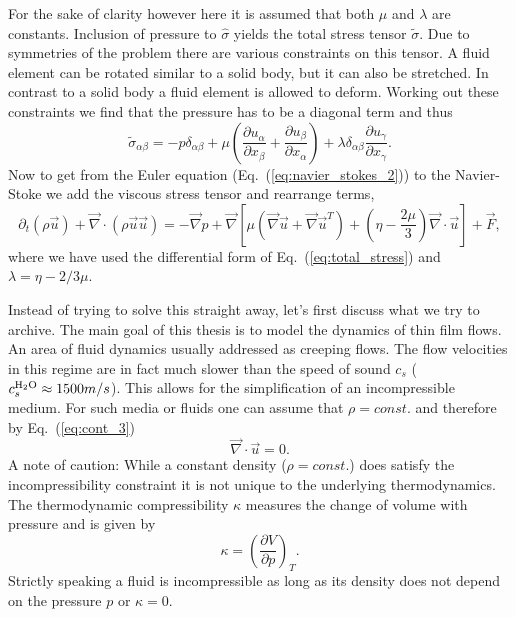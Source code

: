 For the sake of clarity however here it is assumed that both $\mu$ and $\lambda$ are constants.
Inclusion of pressure to $\hat{\sigma}$ yields the total stress tensor $\tilde{\sigma}$. 
Due to symmetries of the problem there are various constraints on this tensor.
A fluid element can be rotated similar to a solid body, but it can also be stretched. 
In contrast to a solid body a fluid element is allowed to deform.
Working out these constraints we find that the pressure has to be a diagonal term and thus
\begin{equation}\label{eq:total_stress}
    \tilde{\sigma}_{\alpha\beta} = - p \delta_{\alpha\beta} + \mu\left(\frac{\partial u_{\alpha}}{\partial x_{\beta}} + \frac{\partial u_{\beta}}{\partial x_{\alpha}}\right) + \lambda\delta_{\alpha\beta}\frac{\partial u_{\gamma}}{\partial x_{\gamma}}.
\end{equation}
Now to get from the Euler equation (Eq.~(\ref{eq:navier_stokes_2})) to the Navier-Stoke we add the viscous stress tensor and rearrange terms,
\begin{equation}\label{eq:navier_stokes_3}
    \partial_t(\rho\vec{u}) + \vec{\nabla}\cdot(\rho\vec{u}\vec{u}) = - \vec{\nabla} p + \vec{\nabla}\left[\mu(\vec{\nabla}\vec{u} + \vec{\nabla}\vec{u}^T) + \left(\eta-\frac{2\mu}{3}\right)\vec{\nabla}\cdot\vec{u}\right] + \vec{F},
\end{equation}
where we have used the differential form of Eq.~(\ref{eq:total_stress}) and $\lambda = \eta - 2/3\mu$.

Instead of trying to solve this straight away, let's first discuss what we try to archive.
The main goal of this thesis is to model the dynamics of thin film flows.
An area of fluid dynamics usually addressed as creeping flows. 
The flow velocities in this regime are in fact much slower than the speed of sound $c_s$ ($c_s^{\ce{H2O}} \approx 1500m/s $). 
This allows for the simplification of an incompressible medium.
For such media or fluids one can assume that $\rho = const.$ and therefore by Eq.~(\ref{eq:cont_3}) 
\begin{equation}\label{eq:incomp}
    \vec{\nabla}\cdot\vec{u} = 0.
\end{equation}
A note of caution: While a constant density ($\rho = const.$) does satisfy the incompressibility constraint it is not unique to the underlying thermodynamics.
The thermodynamic compressibility $\kappa$ measures the change of volume with pressure and is given by 
\begin{equation}
    \kappa = \left(\frac{\partial V}{\partial p}\right)_T.
\end{equation}
Strictly speaking a fluid is incompressible as long as its density does not depend on the pressure $p$ or $\kappa = 0$.

